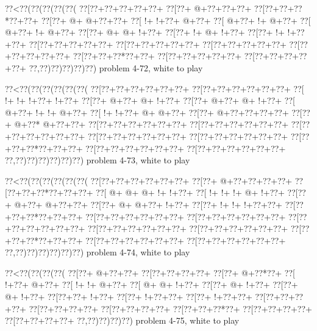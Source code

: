 \vbox{\vbox{\goo
\0??<\0??(\0??(\0??(\0??(\0??(
\0??[\0??+\0??+\0??+\0??+\0??+
\0??[\0??+\- @+\0??+\0??+\0??+
\0??[\0??+\0??+\0??*\0??+\0??+
\0??[\0??+\- @+\- @+\0??+\0??+
\0??[\- !+\- !+\0??+\- @+\0??+
\0??[\- @+\0??+\- !+\- @+\0??+
\0??[\- @+\0??+\- !+\- @+\0??+
\0??[\0??+\- @+\- @+\- !+\0??+
\0??[\0??+\- !+\- @+\- !+\0??+
\0??[\0??+\- !+\- !+\0??+\0??+
\0??[\0??+\0??+\0??+\0??+\0??+
\0??[\0??+\0??+\0??+\0??+\0??+
\0??[\0??+\0??+\0??+\0??+\0??+
\0??[\0??+\0??+\0??+\0??+\0??+
\0??[\0??+\0??+\0??*\0??+\0??+
\0??[\0??+\0??+\0??+\0??+\0??+
\0??[\0??+\0??+\0??+\0??+\0??+
\0??,\0??)\0??)\0??)\0??)\0??)
}
\hfil problem 4-72, white to play\hfil\break
}

\vbox{\vbox{\goo
\0??<\0??(\0??(\0??(\0??(\0??(\0??(
\0??[\0??+\0??+\0??+\0??+\0??+\0??+
\0??[\0??+\0??+\0??+\0??+\0??+\0??+
\0??[\- !+\- !+\- !+\0??+\- !+\0??+
\0??[\0??+\- @+\0??+\- @+\- !+\0??+
\0??[\0??+\- @+\0??+\- @+\- !+\0??+
\0??[\- @+\0??+\- !+\- !+\- @+\0??+
\0??[\- !+\- !+\0??+\- @+\- @+\0??+
\0??[\0??+\- @+\0??+\0??+\0??+\0??+
\0??[\0??+\- @+\0??*\- @+\0??+\0??+
\0??[\0??+\0??+\0??+\0??+\0??+\0??+
\0??[\0??+\0??+\0??+\0??+\0??+\0??+
\0??[\0??+\0??+\0??+\0??+\0??+\0??+
\0??[\0??+\0??+\0??+\0??+\0??+\0??+
\0??[\0??+\0??+\0??+\0??+\0??+\0??+
\0??[\0??+\0??+\0??*\0??+\0??+\0??+
\0??[\0??+\0??+\0??+\0??+\0??+\0??+
\0??[\0??+\0??+\0??+\0??+\0??+\0??+
\0??,\0??)\0??)\0??)\0??)\0??)\0??)
}
\hfil problem 4-73, white to play\hfil\break
}

\vbox{\vbox{\goo
\0??<\0??(\0??(\0??(\0??(\0??(\0??(
\0??[\0??+\0??+\0??+\0??+\0??+\0??+
\0??[\0??+\- @+\0??+\0??+\0??+\0??+
\0??[\0??+\0??+\0??*\0??+\0??+\0??+
\0??[\- @+\- @+\- @+\- !+\- !+\0??+
\0??[\- !+\- !+\- !+\- @+\- !+\0??+
\0??[\0??+\- @+\0??+\- @+\0??+\0??+
\0??[\0??+\- @+\- @+\0??+\- !+\0??+
\0??[\0??+\- !+\- !+\- !+\0??+\0??+
\0??[\0??+\0??+\0??*\0??+\0??+\0??+
\0??[\0??+\0??+\0??+\0??+\0??+\0??+
\0??[\0??+\0??+\0??+\0??+\0??+\0??+
\0??[\0??+\0??+\0??+\0??+\0??+\0??+
\0??[\0??+\0??+\0??+\0??+\0??+\0??+
\0??[\0??+\0??+\0??+\0??+\0??+\0??+
\0??[\0??+\0??+\0??*\0??+\0??+\0??+
\0??[\0??+\0??+\0??+\0??+\0??+\0??+
\0??[\0??+\0??+\0??+\0??+\0??+\0??+
\0??,\0??)\0??)\0??)\0??)\0??)\0??)
}
\hfil problem 4-74, white to play\hfil\break
}

\vbox{\vbox{\goo
\0??<\0??(\0??(\0??(\0??(
\0??[\0??+\- @+\0??+\0??+
\0??[\0??+\0??+\0??+\0??+
\0??[\0??+\- @+\0??*\0??+
\0??[\- !+\0??+\- @+\0??+
\0??[\- !+\- !+\- @+\0??+
\0??[\- @+\- @+\- !+\0??+
\0??[\0??+\- @+\- !+\0??+
\0??[\0??+\- @+\- !+\0??+
\0??[\0??+\0??+\- !+\0??+
\0??[\0??+\- !+\0??+\0??+
\0??[\0??+\- !+\0??+\0??+
\0??[\0??+\0??+\0??+\0??+
\0??[\0??+\0??+\0??+\0??+
\0??[\0??+\0??+\0??+\0??+
\0??[\0??+\0??+\0??*\0??+
\0??[\0??+\0??+\0??+\0??+
\0??[\0??+\0??+\0??+\0??+
\0??,\0??)\0??)\0??)\0??)
}
\hfil problem 4-75, white to play\hfil\break
}

